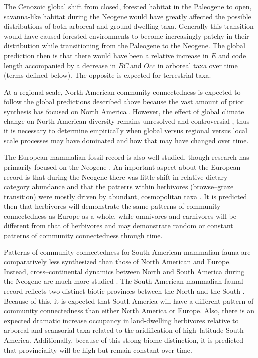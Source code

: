 \documentclass[12pt,letterpaper]{article}
\begin{document}
The Cenozoic global shift from closed, forested habitat in the Paleogene to open, savanna-like habitat during the Neogene would have greatly affected the possible distributions of both arboreal and ground dwelling taxa. Generally this transition would have caused forested environments to become increasingly patchy in their distribution while transitioning from the Paleogene to the Neogene. The global prediction then is that there would have been a relative increase in \(E\) and code length accompanied by a decrease in \(BC\) and \(Occ\) in arboreal taxa over time (terms defined below). The opposite is expected for terrestrial taxa. 

At a regional scale, North American community connectedness is expected to follow the global predictions described above because the vast amount of prior synthesis has focused on North America \citep{Alroy2000g,Alroy1996a,Alroy1998,Barnosky2001a,Simpson1944,Simpson1953,Badgley2013,Blois2009,Figueirido2012,Gunnell1995,Hadly2001}. However, the effect of global climate change on North American diversity remains unresolved and controversial \citep{Alroy2000g,Blois2009,Figueirido2012,Barnosky2001a}, thus it is necessary to determine empirically when global versus regional versus local scale processes may have dominated and how that may have changed over time.

The European mammalian fossil record is also well studied, though research has primarily focused on the Neogene \citep{Jernvall2002,Jernvall2004,Liow2008,Raia2006,Raia2005,Raia2011c}. An important aspect about the European record is that during the Neogene there was little shift in relative dietary category abundance \citep{Jernvall2004} and that the patterns within herbivores (browse--graze transition) were mostly driven by abundant, cosmopolitan taxa \citep{Jernvall2002}. It is predicted then that herbivores will demonstrate the same patterns of community connectedness as Europe as a whole, while omnivores and carnivores will be different from that of herbivores and may demonstrate random or constant patterns of community connectedness through time. 

Patterns of community connectedness for South American mammalian fauna are comparatively less synthesized than those of North American and Europe. Instead, cross--continental dynamics between North and South America during the Neogene are much more studied \citep{Marshall1982}. The South American mammalian faunal record reflects two distinct biotic provinces between the North and the South \citep{Macfadden1997,Macfadden2006,Flynn1998a,Patterson1968}. Because of this, it is expected that South America will have a different pattern of community connectedness than either North America or Europe. Also, there is an expected dramatic increase occupancy in land-dwelling herbivores relative to arboreal and scansorial taxa related to the aridification of high--latitude South America. Additionally, because of this strong biome distinction, it is predicted that provinciality will be high but remain constant over time. %
\end{document}
